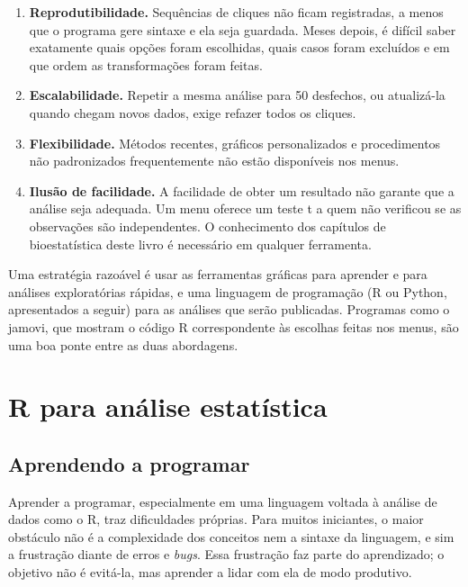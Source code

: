 \documentclass[
]{book}
\providecommand{\tightlist}{%
  \setlength{\itemsep}{0pt}\setlength{\parskip}{0pt}}
\begin{document}
\begin{enumerate}
\def\labelenumi{\arabic{enumi}.}
\tightlist
\item
  \textbf{Reprodutibilidade.} Sequências de cliques não ficam registradas, a menos que o programa gere sintaxe e ela seja guardada. Meses depois, é difícil saber exatamente quais opções foram escolhidas, quais casos foram excluídos e em que ordem as transformações foram feitas.
\item
  \textbf{Escalabilidade.} Repetir a mesma análise para 50 desfechos, ou atualizá-la quando chegam novos dados, exige refazer todos os cliques.
\item
  \textbf{Flexibilidade.} Métodos recentes, gráficos personalizados e procedimentos não padronizados frequentemente não estão disponíveis nos menus.
\item
  \textbf{Ilusão de facilidade.} A facilidade de obter um resultado não garante que a análise seja adequada. Um menu oferece um teste t a quem não verificou se as observações são independentes. O conhecimento dos capítulos de bioestatística deste livro é necessário em qualquer ferramenta.
\end{enumerate}

Uma estratégia razoável é usar as ferramentas gráficas para aprender e para análises exploratórias rápidas, e uma linguagem de programação (R ou Python, apresentados a seguir) para as análises que serão publicadas. Programas como o jamovi, que mostram o código R correspondente às escolhas feitas nos menus, são uma boa ponte entre as duas abordagens.

\section{R para análise estatística}\label{r-para-anuxe1lise-estatuxedstica}

\subsection{Aprendendo a programar}\label{aprendendo-a-programar}

Aprender a programar, especialmente em uma linguagem voltada à análise de dados como o R, traz dificuldades próprias. Para muitos iniciantes, o maior obstáculo não é a complexidade dos conceitos nem a sintaxe da linguagem, e sim a frustração diante de erros e \emph{bugs}. Essa frustração faz parte do aprendizado; o objetivo não é evitá-la, mas aprender a lidar com ela de modo produtivo.
\end{document}
